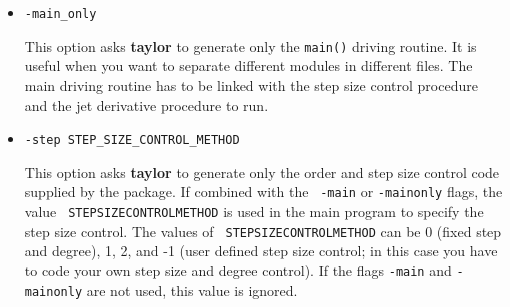 \documentclass[10pt]{article}
\theoremstyle{remark}
\newcommand{\taylorname}{{\bf taylor}}
\begin{document}
\begin{itemize}
{This option select a jet library. By default, \taylorname{} uses the
\verb+jet_tree+ library. This option allows you to overwrite that with
a special purpose library. Possible value for \verb+JETLIBRARY+ are:
\begin{itemize}
    \item \verb+jet1_1+ one symbol, degree one. The arithmetic is
      implemented using C macros.
    \item \verb+jet1+  one symbol, arbitrary degree. 
    \item \verb+jet_1+ degree one, arbitrary number of symbols.
    \item \verb+jet2+ two symbols, arbitrary degree.
    \item \verb+jet_2+ degree two, arbitrary number of symbols.
    \item \verb+jet_m+ an naive implementation of the general case,
      arbitrary number of symbols, arbitrary degree. This
      implementation works well when the jet size is below 1000 terms,
      i.e., when ${{d+m} \choose {d}} < 1000$.
    \item \verb+jet_tree+ a general library\footnote{based on \url{     http://www.maia.ub.es/dsg/param/chapter2.html}}. This is the
      default.
\end{itemize}
}
\item{\verb+-main_only+

This option asks \taylorname{} to generate only the \verb+main()+
driving routine. It is useful when you want to separate different
modules in different files. The main driving routine has to be linked
with the step size control procedure and the jet derivative procedure
to run.  }

\item{\verb+-step STEP_SIZE_CONTROL_METHOD+

This option asks \taylorname{} to generate only the order and step
size control code supplied by the package. If combined with the {\tt
  -main} or {\tt -mainonly} flags, the value {\tt
  STEPSIZECONTROLMETHOD} is used in
the main program to specify the step size control. The values of {\tt
  STEPSIZECONTROLMETHOD} can be 0
(fixed step and degree), 1, 2, and -1 (user defined step size control;
in this case you have to code your own step size and degree
control). If the flags {\tt -main} and {\tt -mainonly} are
not used, this value is ignored.

}
\end{itemize}
\end{document}
